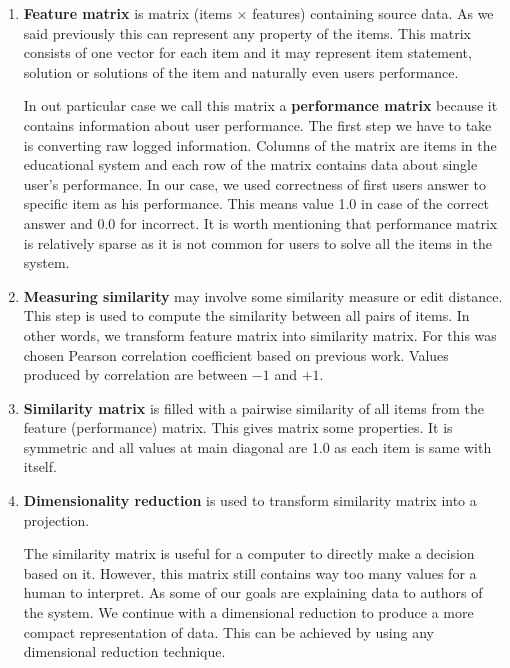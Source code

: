 \documentclass[
  digital, %
  table,   %
  nolof,     %
  nolot,     %
  nocover,
  color
]{fithesis3}
\begin{document}
\begin{enumerate}
  \item
    \textbf{Feature matrix} is matrix (items $\times$ features) containing source data. As we said previously this can represent any property of the items. This matrix consists of one vector for each item and it may represent item statement, solution or solutions of the item and naturally even users performance.

    In out particular case we call this matrix a \textbf{performance matrix} because it contains information about user performance. The first step we have to take is converting raw logged information. Columns of the matrix are items in the educational system and each row of the matrix contains data about single user's performance. In our case, we used correctness of first users answer to specific item as his performance. This means value 1.0 in case of the correct answer and 0.0 for incorrect. It is worth mentioning that performance matrix is relatively sparse as it is not common for users to solve all the items in the system.

  \item
    \textbf{Measuring similarity} may involve some similarity measure or edit distance. This step is used to compute the similarity between all pairs of items. In other words, we transform feature matrix into similarity matrix. For this was chosen Pearson correlation coefficient based on previous work. Values produced by correlation are between $-1$ and $+1$.

  \item
    \textbf{Similarity matrix} is filled with a pairwise similarity of all items from the feature (performance) matrix. This gives matrix some properties. It is symmetric and all values at main diagonal are 1.0 as each item is same with itself.

  \item
    \textbf{Dimensionality reduction} is used to transform similarity matrix into a projection.


    The similarity matrix is useful for a computer to directly make a decision based on it. However, this matrix still contains way too many values for a human to interpret. As some of our goals are explaining data to authors of the system. We continue with a dimensional reduction to produce a more compact representation of data. This can be achieved by using any dimensional reduction technique.


\end{enumerate}
\end{document}
